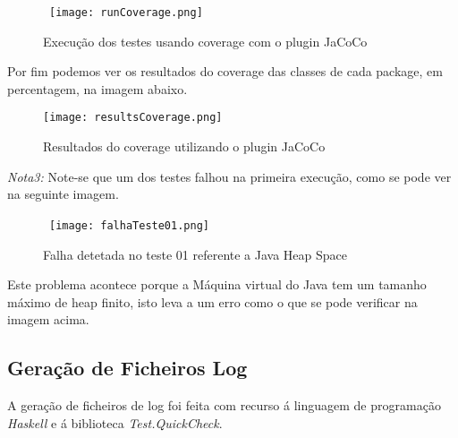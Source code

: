 \begin{figure}[H]

  \centering

  \hbox{\hspace{-10em} \texttt{[image: runCoverage.png]}}

  \caption {Execução dos testes usando coverage com o plugin JaCoCo}

  \label {fig43}

\end{figure}

\par Por fim podemos ver os resultados do coverage das classes de cada package, em percentagem, na imagem abaixo.

\begin{figure}[H]

  \centering

  \texttt{[image: resultsCoverage.png]}

  \caption {Resultados do coverage utilizando o plugin JaCoCo}

  \label {fig44}

\end{figure}

\par \textit{Nota3:} Note-se que um dos testes falhou na primeira execução, como se pode ver na seguinte imagem.

\begin{figure}[H]

  \centering

  \hbox{\hspace{-11em} \texttt{[image: falhaTeste01.png]}}

  \caption {Falha detetada no teste 01 referente a Java Heap Space}

  \label {fig44}

\end{figure}

\par Este problema acontece porque a Máquina virtual do Java tem um tamanho máximo de heap finito, isto leva a um erro como o que se pode verificar na imagem acima.\newline

\subsection{Geração de Ficheiros Log}

\par A geração de ficheiros de log foi feita com recurso á linguagem de programação \textit{Haskell} e á biblioteca \textit{Test.QuickCheck}.\newline

